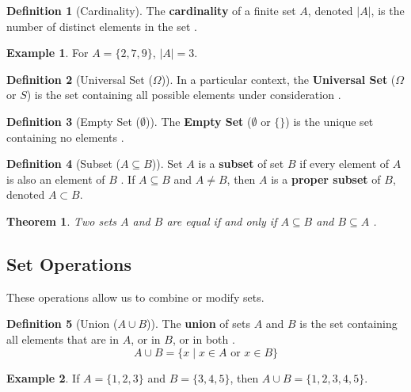 \documentclass[12pt, a4paper]{article}
\theoremstyle{definition}
\newtheorem{definition}{Definition}[section]
\newtheorem{example}{Example}[section]
\theoremstyle{plain}
\newtheorem{theorem}{Theorem}[section]
\theoremstyle{remark}
\begin{document}
\begin{definition}[Cardinality]
    The \textbf{cardinality} of a finite set $A$, denoted $|A|$, is the number of distinct elements in the set \cite{faculty_set}.
\end{definition}

\begin{example}
    For $A = \{2, 7, 9\}$, $|A| = 3$.
\end{example}

\begin{definition}[Universal Set ($\Omega$)]
    In a particular context, the \textbf{Universal Set} ($\Omega$ or $S$) is the set containing all possible elements under consideration \cite{faculty_set, chan}.
\end{definition}

\begin{definition}[Empty Set ($\emptyset$)]
    The \textbf{Empty Set} ($\emptyset$ or $\{\}$) is the unique set containing no elements \cite{faculty_set, ross}.
\end{definition}

\begin{definition}[Subset ($A \subseteq B$)]
    Set $A$ is a \textbf{subset} of set $B$ if every element of $A$ is also an element of $B$ \cite{chan}. If $A \subseteq B$ and $A \ne B$, then $A$ is a \textbf{proper subset} of $B$, denoted $A \subset B$.
\end{definition}

\begin{theorem}
    Two sets $A$ and $B$ are equal if and only if $A \subseteq B$ and $B \subseteq A$ \cite{chan}.
\end{theorem}

\subsection{Set Operations}

These operations allow us to combine or modify sets.

\begin{definition}[Union ($A \cup B$)]
    The \textbf{union} of sets $A$ and $B$ is the set containing all elements that are in $A$, or in $B$, or in both \cite{ross}.
    $$A \cup B = \{x \mid x \in A \text{ or } x \in B\}$$
\end{definition}

\begin{example}
    If $A = \{1, 2, 3\}$ and $B = \{3, 4, 5\}$, then $A \cup B = \{1, 2, 3, 4, 5\}$.
\end{example}
\end{document}
